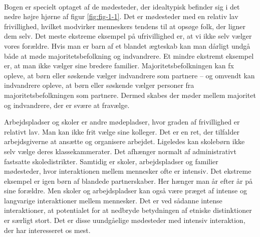 \documentclass[
]{book}
\begin{document}
~~

Bogen er specielt optaget af de mødesteder, der idealtypisk befinder sig i det nedre højre hjørne af figur \ref{fig:fig-1-1}. Det er mødesteder med en relativ lav frivillighed, hvilket modvirker menneskers tendens til at opsøge folk, der ligner dem selv. Det meste ekstreme eksempel på ufrivillighed er, at vi ikke selv vælger vores forældre. Hvis man er barn af et blandet ægteskab kan man dårligt undgå både at møde majoritetsbefolkning og indvandrere. Et mindre ekstremt eksempel er, at man ikke vælger sine bredere familier. Majoritetsbefolkningen kan fx opleve, at børn eller søskende vælger indvandrere som partnere -- og omvendt kan indvandrere opleve, at børn eller søskende vælger personer fra majoritetsbefolkningen som partnere. Dermed skabes der møder mellem majoritet og indvandrere, der er svære at fravælge.

Arbejdspladser og skoler er andre mødepladser, hvor graden af frivillighed er relativt lav. Man kan ikke frit vælge sine kolleger. Det er en ret, der tilfalder arbejdsgiverne at ansætte og organisere arbejdet. Ligeledes kan skolebørn ikke selv vælge deres klassekammerater. Det afhænger normalt af administrativt fastsatte skoledistrikter. Samtidig er skoler, arbejdspladser og familier mødesteder, hvor interaktionen mellem mennesker ofte er intensiv. Det ekstreme eksempel er igen børn af blandede partnerskaber. Her hænger man år efter år på sine forældre. Men skoler og arbejdspladser kan også være præget af intense og langvarige interaktioner mellem mennesker. Det er ved sådanne intense interaktioner, at potentialet for at nedbryde betydningen af etniske distinktioner er særligt stort. Det er disse uundgåelige mødesteder med intensiv interaktion, der har interesseret os mest.
\end{document}
